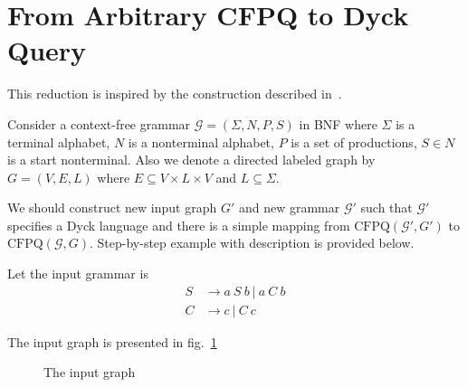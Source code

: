 \section{From Arbitrary CFPQ to Dyck Query}

This reduction is inspired by the construction described in~\cite{OptimalDLR}.

Consider a context-free grammar $\mathcal{G}=(\Sigma, N, P, S)$ in BNF where $\Sigma$ is a terminal alphabet, $N$ is 
a nonterminal alphabet, $P$ is a set of productions, $S \in N$ is a start nonterminal.
Also we denote a directed labeled graph by $G=(V,E,L)$ where $E \subseteq V \times L \times V$ and $L \subseteq \Sigma$. 

We should construct new input graph $G'$ and new grammar $\mathcal{G'}$ such that $\mathcal{G'}$ specifies a Dyck language and there is a simple mapping from $\text{CFPQ}(\mathcal{G'}, G')$ to $\text{CFPQ}(\mathcal{G}, G)$.
Step-by-step example with description is provided below.
 
Let the input grammar is 
\begin{align*}
S & \rightarrow a \ S \ b \ | \ a \ C \ b 
\\
C & \rightarrow c \ | \ C \ c
\end{align*}

The input graph is presented in fig.~\ref{input}

\begin{figure}
\resizebox{.5\textwidth}{!}
{
}
\label{input}
\caption{The input graph}

\end{figure}

